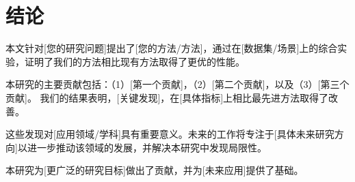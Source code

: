 \section{结论}
\label{sec:conclusion}


本文针对[您的研究问题]提出了[您的方法/方法]，通过在[数据集/场景]上的综合实验，证明了我们的方法相比现有方法取得了更优的性能。

本研究的主要贡献包括：（1）[第一个贡献]，（2）[第二个贡献]，以及（3）[第三个贡献]。
我们的结果表明，[关键发现]，在[具体指标]上相比最先进方法取得了改善。

这些发现对[应用领域/学科]具有重要意义。未来的工作将专注于[具体未来研究方向]以进一步推动该领域的发展，并解决本研究中发现局限性。

本研究为[更广泛的研究目标]做出了贡献，并为[未来应用]提供了基础。
